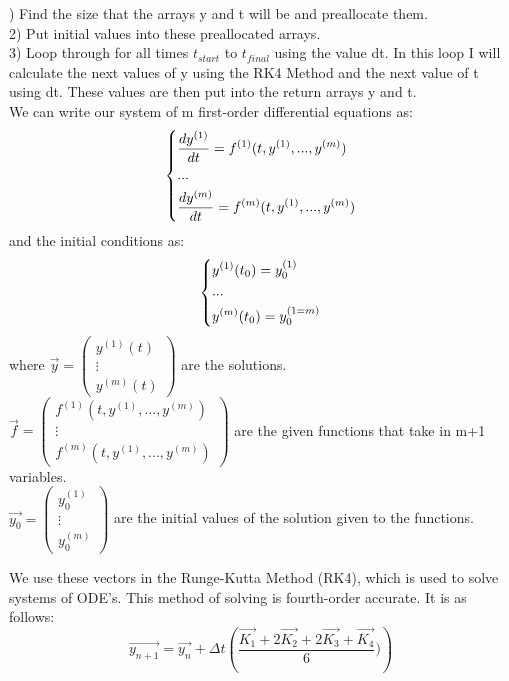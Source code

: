 \documentclass[12pt]{article}
\begin{document}
) Find the size that the arrays y and t will be and preallocate them.\\
2) Put initial values into these preallocated arrays.\\
3) Loop through for all times $t_{start}$ to $t_{final}$ using the value dt. In this loop I will calculate the next values of y using the RK4 Method and the next value of t using dt. These values are then put into the return arrays y and t.\\

\noindent We can write our system of m first-order differential equations as:
\begin{equation}
\begin{dcases}
\frac{dy^{(1)}}{dt} = f^{(1)}(t, y^{(1)}, ..., y^{(m)})\\
...\\
\frac{dy^{(m)}}{dt} = f^{(m)}(t, y^{(1)}, ..., y^{(m)})
\end{dcases}
\end{equation}
and the initial conditions as:
\begin{equation}
\begin{dcases}
y^{(1)}(t_{0}) = y_{0}^{(1)}\\
...\\
y^{(m)}(t_{0}) = y_{0}^{(1=m)}
\end{dcases}
\end{equation}
where $\vec{y}= \begin{pmatrix} y^{(1)}(t) \\ \vdots \\ y^{(m)}(t) \end{pmatrix}$ are the solutions.\\
$\vec{f}= \begin{pmatrix} f^{(1)}(t, y^{(1)}, ..., y^{(m)}) \\ \vdots \\ f^{(m)}(t, y^{(1)}, ..., y^{(m)})  \end{pmatrix}$ are the given functions that take in m+1 variables.\\
$\vec{y_{0}}= \begin{pmatrix} y_{0}^{(1)} \\ \vdots \\ y_{0}^{(m)}  \end{pmatrix}$ are the initial values of the solution given to the functions.

We use these vectors in the Runge-Kutta Method (RK4), which is used to solve systems of ODE's. This method of solving is fourth-order accurate. It is as follows:
\begin{equation}
\vec{y_{n+1}} = \vec{y_{n}} + \Delta t\left(\frac{\vec{K_{1} }+ 2\vec{K_{2}} + 2\vec{K_{3}} + \vec{K_{4}}}{6})\right)
\end{equation}
\end{document}
